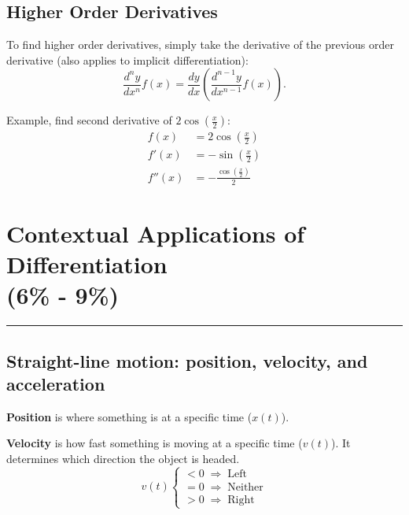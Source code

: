 \documentclass[12pt]{article}
\newcommand{\fline}{\par\noindent\rule{\textwidth}{0.1pt}} %
\begin{document}
        \subsection{Higher Order Derivatives}
            To find higher order derivatives, simply take the derivative of the previous order derivative (also applies to implicit differentiation):
            \[ \frac{d^n y}{dx^n} f(x) = \frac{dy}{dx} \left( \frac{d^{n-1}y}{dx^{n-1}} f(x) \right). \]

            \noindent Example, find second derivative of $2\cos \left( \frac{x}{2} \right)$:
            \begin{align*}
                f(x) &= 2\cos \left( \frac{x}{2} \right) \\[6pt]
                f'(x) &= -\sin \left( \frac{x}{2} \right) \\[6pt]
                f''(x) &= -\frac{\cos \left( \frac{x}{2} \right)}{2}
            \end{align*}

    \section[Contextual Applications of Differentiation (6\% - 9\%)]{Contextual Applications of Differentiation \\(6\% - 9\%)}
    \fline

        \subsection{Straight-line motion: position, velocity, and acceleration}
            \noindent \textbf{Position} is where something is at a specific time ($x(t)$).

            \noindent \textbf{Velocity} is how fast something is moving at a specific time ($v(t)$). It determines which direction the object is headed.
            \[ v(t) \begin{cases}
                <0 \; \Rightarrow \; \text{Left} \\
                =0 \; \Rightarrow \; \text{Neither} \\
                >0 \; \Rightarrow \; \text{Right}
            \end{cases} \]
\end{document}
